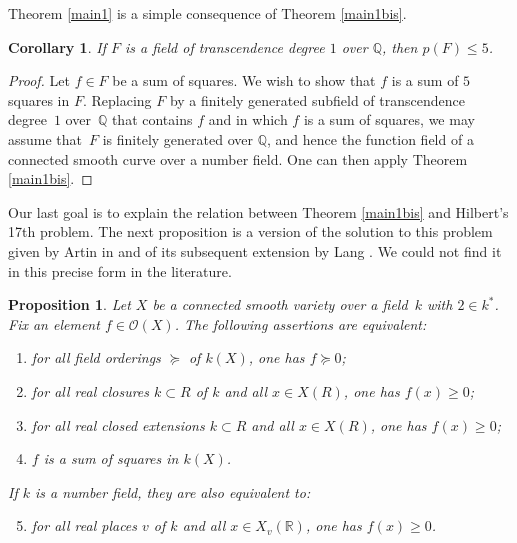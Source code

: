 \documentclass{amsart}
\newtheorem{prop}[thm]{Proposition}
\newtheorem{cor}[thm]{Corollary}
\theoremstyle{definition}
\theoremstyle{remark}
\numberwithin{equation}{section}
\def\Q{\mathbb Q}
\def\R{\mathbb R}
\def\cO{\mathcal{O}}
\begin{document}
 Theorem \ref{main1} is a simple consequence of Theorem \ref{main1bis}.
 
\begin{cor}
If $F$ is a field of transcendence degree $1$ over $\Q$, then $p(F)\leq 5$.
\end{cor}

\begin{proof}
Let $f\in F$ be a sum of squares. We wish to show that $f$ is a sum of $5$ squares in $F$. Replacing $F$ by a finitely generated subfield of transcendence degree~$1$ over~$\Q$ that contains $f$ and in which $f$ is a sum of squares, we may assume that~$F$ is finitely generated over $\Q$, and hence the function field of a connected smooth curve over a number field. One can then apply Theorem \ref{main1bis}.
\end{proof}

Our last goal is to explain the relation between Theorem \ref{main1bis} and Hilbert's 17th problem. The next proposition is a version of the solution to this problem given by Artin in \cite{Artin} and of its subsequent extension by Lang \cite[Theorem~9]{Lang}. We could not find it in this precise form in the literature.

\begin{prop}
\label{H17}
Let $X$ be a connected smooth variety over a field~$k$ with $2\in k^*$. 
Fix an element $f\in\cO(X)$. The following assertions are equivalent:
\begin{enumerate}[label=(\roman*)] 
\item for all field orderings $\succeq$ of $k(X)$, one has $f\succeq 0$;
\label{i}
\item for all real closures $k\subset R$ of $k$ and all $x\in X(R)$, one has $f(x)\geq 0$;
\label{ii}
\item for all real closed extensions $k\subset R$ and all $x\in X(R)$, one has $f(x)\geq 0$;
\label{iv}
\item $f$ is a sum of squares in $k(X)$.
\label{iii}
\end{enumerate}
If $k$ is a number field, they are also equivalent to:
\begin{enumerate}[label=(\roman*)] 
\setcounter{enumi}{4}
\item for all real places $v$ of $k$ and all $x\in X_v(\R)$, one has $f(x)\geq 0$.
\label{v}
\end{enumerate}
\end{prop}
\end{document}
